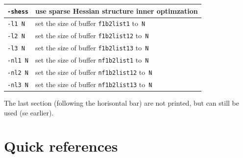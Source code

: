 \documentclass[12pt,letter,reqno]{book}
\begin{document}
\begin{center}
\begin{tabular}{ll}
\texttt{-shess} &         use sparse Hessian structure inner optimzation\\
\hline
\texttt{-l1 N} & set the size of buffer \texttt{f1b2list1} to~\texttt{N}  \\
\texttt{-l2 N} & set the size of buffer \texttt{f1b2list12} to~\texttt{N}  \\
\texttt{-l3 N} & set the size of buffer \texttt{f1b2list13} to~\texttt{N}  \\
\texttt{-nl1 N} & set the size of buffer \texttt{nf1b2list1} to~\texttt{N} \\
\texttt{-nl2 N} & set the size of buffer \texttt{nf1b2list12} to~\texttt{N} \\
\texttt{-nl3 N} & set the size of buffer \texttt{nf1b2list13} to~\texttt{N} \\\hline
\end{tabular}
\end{center}
The last section (following the horisontal bar) are not printed, but can still be used (se earlier).


\chapter{Quick references}
\label{sec:quick}
\end{document}
